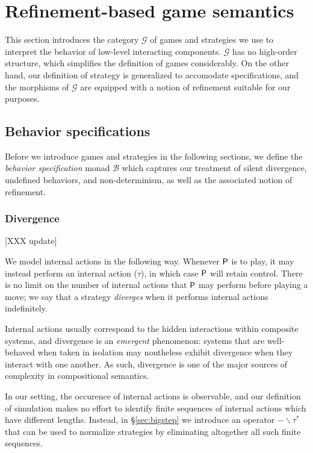 \section{Refinement-based game semantics}

This section introduces the category $\mathcal{G}$ of games and strategies
we use to interpret the behavior of low-level interacting components.
$\mathcal{G}$ has no high-order structure,
which simplifies the definition of games considerably.
On the other hand,
our definition of strategy is generalized to accomodate specifications,
and the morphisms of $\mathcal{G}$ are equipped with a notion of refinement
suitable for our purposes.

\subsection{Behavior specifications}

Before we introduce games and strategies
in the following sections,
we define the \emph{behavior specification} monad $\mathcal{B}$
which captures our treatment of
silent divergence, undefined behaviors, and non-determinism,
as well as the associated notion of refinement.

\subsubsection{Divergence} %

[XXX update]

We model internal actions in the following way.
Whenever $ \mathsf{P} $ is to play,
it may instead perform an internal action ($\tau$),
in which case $ \mathsf{P} $ will retain control.
There is no limit on the number of internal actions that
$ \mathsf{P} $ may perform before playing a move;
we say that a strategy \emph{diverges}
when it performs internal actions indefinitely.

Internal actions usually correspond to the hidden interactions
within composite systems, and
divergence is an \emph{emergent} phenomenon:
systems that are well-behaved when taken in isolation
may nontheless exhibit divergence when they interact with one another.
As such,
divergence is one of the major sources of complexity
in compositional semantics.

In our setting,
the occurence of internal actions
is observable,
and our definition of simulation
makes no effort
to identify finite sequences of internal actions
which have different lengths.
Instead,
in \S\ref{sec:bigstep}
we introduce an operator $- \backslash \tau^*$
that can be used to normalize strategies
by eliminating altogether all such finite sequences.

